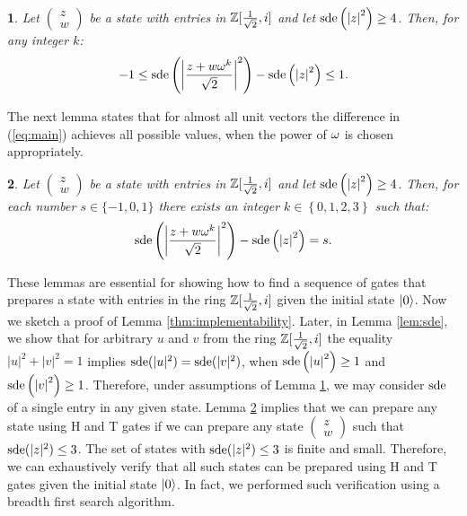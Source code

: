 \documentclass[english,journal]{extarticle}
\theoremstyle{plain}
\theoremstyle{plain}
\theoremstyle{plain}
\newtheorem{lem}{\protect\lemmaname}
\theoremstyle{definition}
\theoremstyle{plain}
\theoremstyle{plain}
\providecommand{\lemmaname}{\inputencoding{latin9}Lemma}
\begin{document}
\begin{lem}
\label{thm:Main}Let $\left(\begin{array}{c}
z\\
w
\end{array}\right)$ be a state with entries in $\mathbb{Z}[\frac{1}{\sqrt{2}},i]$ and let $\mathrm{sde}\left(\left|z\right|^{2}\right)\ge 4$.
Then, for any integer $k$: 
\begin{equation}
-1\le\mathrm{sde}\left(\left|\frac{z+w\omega^{k}}{\sqrt{2}}\right|^{2}\right)-\mathrm{sde}\left(\left|z\right|^{2}\right)\le 1\label{eq:main}.
\end{equation}

\end{lem}
The next lemma states that for almost all unit vectors the difference
in (\ref{eq:main}) achieves all possible values, when the power of $\omega$
is chosen appropriately. 
\begin{lem}
\label{thm:the-second}Let $\left(\begin{array}{c}
z\\
w
\end{array}\right)$ be a state with entries in $\mathbb{Z}[\frac{1}{\sqrt{2}},i]$ and let $\mathrm{sde}\left(\left|z\right|^{2}\right)\ge 4$.
Then, for each number $s \in \{-1,0,1\}$ there exists an integer $k \in\left\{ 0,1,2,3\right\}$
such that: 
\[
\mathrm{sde}\left(\left|\frac{z+w\omega^{k}}{\sqrt{2}}\right|^{2}\right)-\mathrm{sde}\left(\left|z\right|^{2}\right)=s.
\]
\end{lem}
These lemmas are essential for showing how to find a sequence of gates that prepares
a state with entries in the ring $\mathbb{Z}[\frac{1}{\sqrt{2}},i]$ given the initial state $\left|0\right\rangle$.
Now we sketch a proof of Lemma \ref{thm:implementability}. Later,
in Lemma \ref{lem:sde}, we show that for arbitrary $u$ and $v$ from the
ring $\mathbb{Z}[\frac{1}{\sqrt{2}},i]$ the equality $|u|^{2}+|v|^{2}=1$ implies $\mathrm{sde}(|u|^{2})=\mathrm{sde}(|v|^{2})$,
when $\mathrm{sde}\left(\left|u\right|^{2}\right)\ge 1$ and $\mathrm{sde}\left(\left|v\right|^{2}\right)\ge 1$.
Therefore, under assumptions of Lemma \ref{thm:Main}, we may consider
$\mathrm{sde}$ of a single entry in any given state.  Lemma \ref{thm:the-second} implies
that we can prepare any state using H and T gates if we can prepare
any state $\left(\begin{array}{c}
z\\
w
\end{array}\right)$ such that $\mathrm{sde}(|z|^{2})\le 3$.  The set of states with
$\mathrm{sde}(|z|^{2})\le 3$ is finite and small.  Therefore, we can exhaustively verify that all
such states can be prepared using H and T gates given the initial
state $\left|0\right\rangle$.  In fact, we performed such verification using a breadth first
search algorithm. 
\end{document}
